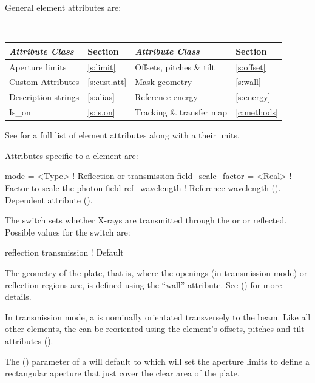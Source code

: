 General  element attributes are:
\begin{center}
\tt 
\begin{tabular}{llll} \toprule
  {\sl Attribute Class}      & Section          & {\sl Attribute Class}      & Section         \\ \midrule
  Aperture limits            & \ref{s:limit}    & Offsets, pitches \& tilt   & \ref{s:offset}   \\ 
  Custom Attributes          & \ref{s:cust.att} & Mask geometry              & \ref{s:wall}    \\
  Description strings        & \ref{s:alias}    & Reference energy           & \ref{s:energy}  \\
  Is_on                      & \ref{s:is.on}    & Tracking \& transfer map   & \ref{c:methods} \\
  \bottomrule
\end{tabular}
\end{center}
\toffset
See  for a full list of element attributes along with a their units.

Attributes specific to a  element are:
\begin{example}
  mode               = <Type>   ! Reflection or transmission
  field_scale_factor = <Real>   ! Factor to scale the photon field
  ref_wavelength                ! Reference wavelength (). Dependent attribute ().
\end{example}

The  switch sets whether X-rays are transmitted through the
 or or reflected. Possible values for the
 switch are:
\begin{example}
  reflection
  transmission        ! Default
\end{example}

The geometry of the plate, that is, where the openings (in
transmission mode) or reflection regions are, is defined using the
``wall'' attribute. See () for more details.

In transmission mode, a  is nominally orientated
transversely to the beam. Like all other elements, the
 can be reoriented using the element's offsets,
pitches and tilt attributes ().

The  () parameter of a
 will default to  which will set the
aperture limits to define a rectangular aperture that just cover the
clear area of the plate.

